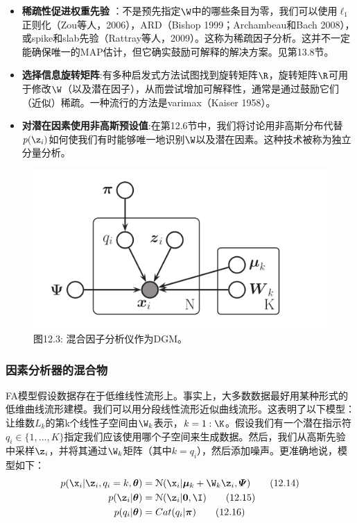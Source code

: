 \documentclass[a4paper]{article}
\begin{document}
\begin{itemize}
\item \textbf{稀疏性促进权重先验 }：不是预先指定$\W$中的哪些条目为零，我们可以使用$\ell
_1$正则化（Zou等人，2006），ARD（Bishop 1999；Archambeau和Bach 2008），或spike和slab先验（Rattray等人，2009）。这称为稀疏因子分析。这并不一定能确保唯一的MAP估计，但它确实鼓励可解释的解决方案。见第13.8节。
\item \textbf{选择信息旋转矩阵}:有多种启发式方法试图找到旋转矩阵$\R$，旋转矩阵$\R$可用于修改$\W$（以及潜在因子），从而尝试增加可解释性，通常是通过鼓励它们（近似）稀疏。一种流行的方法是varimax（Kaiser 1958）。 
\item \textbf{对潜在因素使用非高斯预设值}:在第12.6节中，我们将讨论用非高斯分布代替$p(\z_i)$如何使我们有时能够唯一地识别$\W$以及潜在因素。这种技术被称为独立分量分析。 
\end{itemize}

\begin{figure}[h]
	\centering
	\includegraphics[width=1\linewidth]{fig/figure3}
	\caption*{图12.3: 混合因子分析仪作为DGM。 }
\end{figure}


\subsubsection{因素分析器的混合物}
FA模型假设数据存在于低维线性流形上。事实上，大多数数据最好用某种形式的低维曲线流形建模。我们可以用分段线性流形近似曲线流形。这表明了以下模型：让维数$L_k$的第k个线性子空间由$\W_k$表示，$k=1:\K$。假设我们有一个潜在指示符$q_i\in\{1,...,K\}$指定我们应该使用哪个子空间来生成数据。然后，我们从高斯先验中采样$\z_i$，并将其通过$\W_k$矩阵（其中$k=q_i$），然后添加噪声。更准确地说，模型如下： 
\begin{align}
p(\x_i\vert\z_i,q_i=k,\boldsymbol{\theta})&=\mathcal{N}(\x_i\vert\boldsymbol{\mu}_k+\W_k\z_i,\boldsymbol{\varPsi})\tag{12.14}\\
p(\z_i\vert\boldsymbol{\theta})&=\mathcal{N}(\z_i\vert\boldsymbol{0},\I)\tag{12.15}\\
p(q_i\vert\boldsymbol{\theta})&=Cat(q_i\vert\boldsymbol{\pi})\tag{12.16}
\end{align}
\end{document}
